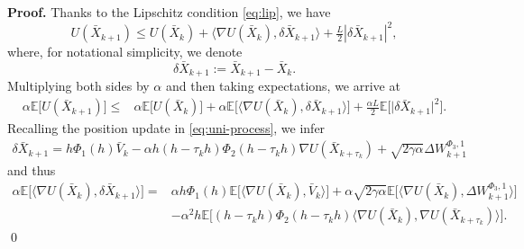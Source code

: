 \documentclass[12pt]{article}
\numberwithin{equation}{section}
\renewenvironment{proof}%
  {\begin{trivlist}%
   \item[]\ignorespaces}%
  {\qed\end{trivlist}}
\newcommand{\X}{\bar{X}}
\begin{document}
\begin{proof}
\textbf{Proof.}
Thanks to the Lipschitz condition \eqref{eq:lip}, we have
\begin{equation}\label{eq:u_x_ineq}
        U(\X_{k+1})
        \leq
        U(\X_{k})
        +
        \langle \nabla U(\X_k), \delta \X_{k+1} \rangle
        +
        \tfrac{L}{2}|\delta \X_{k+1}|^2,
\end{equation}
where, for notational simplicity, we denote 
\begin{equation}
        \delta \bar{X}_{k+1} 
        :=
        \bar{X}_{k+1}-\bar{X}_{k}.
\end{equation}
Multiplying both sides by $\alpha$ and then taking expectations, we arrive at
\begin{equation}
\label{eq:potential-smooth-step}
\begin{aligned}
\alpha \mathbb{E}
\Big[
U(\bar{X}_{k+1})
\Big]
\leq&
\alpha \mathbb{E}
\Big[
U(\bar{X}_k)
\Big]
+
\alpha
\mathbb{E}
\Big[
\big\langle
\nabla U(\bar{X}_k),
\delta \bar{X}_{k+1}
\big\rangle
\Big]
+
\tfrac{\alpha L}{2}
\mathbb{E}
\Big[
\big|
\delta \bar{X}_{k+1}
\big|^2
\Big].
\end{aligned}
\end{equation}
Recalling the position update in \eqref{eq:uni-process}, we infer
\begin{equation}
\label{eq:delta-x-k+1-potential}
\begin{aligned}
\delta \bar{X}_{k+1}
=
h\Phi_1(h)\bar{V}_k
-
\alpha h(h-\tau_kh)\Phi_2(h-\tau_kh)
\nabla U(\bar{X}_{k+\tau_k})
+
\sqrt{2\gamma\alpha}
\Delta W_{k+1}^{\Phi_3,1}
\end{aligned}
\end{equation}
and thus
\begin{equation}
\label{eq:potential-inner-product-decomposition}
\begin{aligned}
\alpha
\mathbb{E}
\Big[
\big\langle
\nabla U(\bar{X}_k),
\delta \bar{X}_{k+1}
\big\rangle
\Big]
=   &
\alpha h\Phi_1(h)
\mathbb{E}
\Big[
\big\langle
\nabla U(\bar{X}_k),
\bar{V}_k
\big\rangle
\Big]
+
\alpha\sqrt{2\gamma\alpha}
\mathbb{E}
\Big[
\big\langle
\nabla U(\bar{X}_k),
\Delta W_{k+1}^{\Phi_3,1}
\big\rangle
\Big]
\\    &
-
\alpha^2h
\mathbb{E}
\Big[
(h-\tau_kh)\Phi_2(h-\tau_kh)
\big\langle
\nabla U(\bar{X}_k),
\nabla U(\bar{X}_{k+\tau_k})
\big\rangle
\Big]
.
\end{aligned}

\end{equation}
\end{proof}
\end{document}
